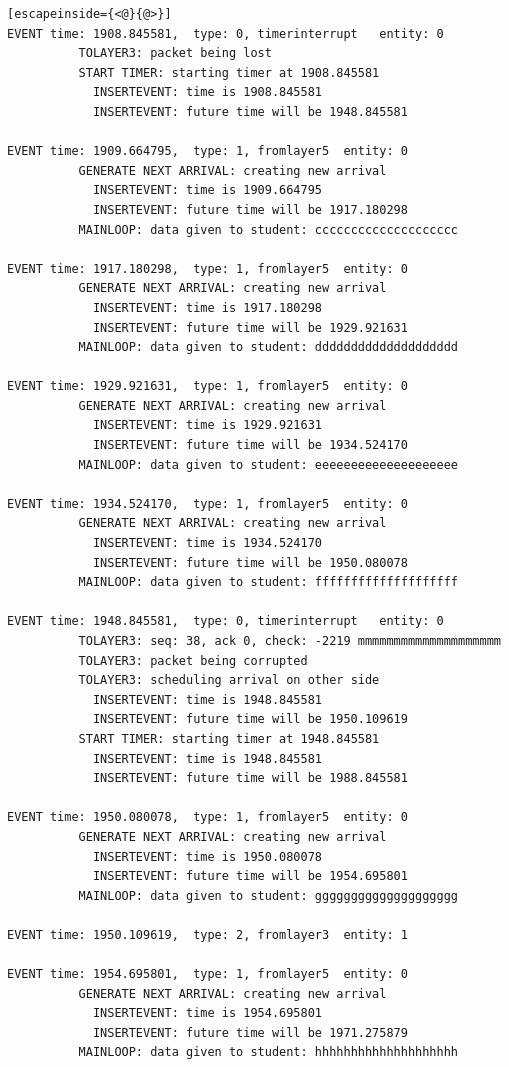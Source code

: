 \documentclass[paper=a4, fontsize=11pt]{scrartcl}
\numberwithin{equation}{section}		%
\numberwithin{figure}{section}			%
\numberwithin{table}{section}				%
\begin{document}
\begin{lstlisting}[escapeinside={<@}{@>}]
EVENT time: 1908.845581,  type: 0, timerinterrupt   entity: 0
          TOLAYER3: packet being lost
          START TIMER: starting timer at 1908.845581
            INSERTEVENT: time is 1908.845581
            INSERTEVENT: future time will be 1948.845581

EVENT time: 1909.664795,  type: 1, fromlayer5  entity: 0
          GENERATE NEXT ARRIVAL: creating new arrival
            INSERTEVENT: time is 1909.664795
            INSERTEVENT: future time will be 1917.180298
          MAINLOOP: data given to student: cccccccccccccccccccc

EVENT time: 1917.180298,  type: 1, fromlayer5  entity: 0
          GENERATE NEXT ARRIVAL: creating new arrival
            INSERTEVENT: time is 1917.180298
            INSERTEVENT: future time will be 1929.921631
          MAINLOOP: data given to student: dddddddddddddddddddd

EVENT time: 1929.921631,  type: 1, fromlayer5  entity: 0
          GENERATE NEXT ARRIVAL: creating new arrival
            INSERTEVENT: time is 1929.921631
            INSERTEVENT: future time will be 1934.524170
          MAINLOOP: data given to student: eeeeeeeeeeeeeeeeeeee

EVENT time: 1934.524170,  type: 1, fromlayer5  entity: 0
          GENERATE NEXT ARRIVAL: creating new arrival
            INSERTEVENT: time is 1934.524170
            INSERTEVENT: future time will be 1950.080078
          MAINLOOP: data given to student: ffffffffffffffffffff

EVENT time: 1948.845581,  type: 0, timerinterrupt   entity: 0
          TOLAYER3: seq: 38, ack 0, check: -2219 mmmmmmmmmmmmmmmmmmmm
          TOLAYER3: packet being corrupted
          TOLAYER3: scheduling arrival on other side
            INSERTEVENT: time is 1948.845581
            INSERTEVENT: future time will be 1950.109619
          START TIMER: starting timer at 1948.845581
            INSERTEVENT: time is 1948.845581
            INSERTEVENT: future time will be 1988.845581

EVENT time: 1950.080078,  type: 1, fromlayer5  entity: 0
          GENERATE NEXT ARRIVAL: creating new arrival
            INSERTEVENT: time is 1950.080078
            INSERTEVENT: future time will be 1954.695801
          MAINLOOP: data given to student: gggggggggggggggggggg

EVENT time: 1950.109619,  type: 2, fromlayer3  entity: 1

EVENT time: 1954.695801,  type: 1, fromlayer5  entity: 0
          GENERATE NEXT ARRIVAL: creating new arrival
            INSERTEVENT: time is 1954.695801
            INSERTEVENT: future time will be 1971.275879
          MAINLOOP: data given to student: hhhhhhhhhhhhhhhhhhhh


\end{lstlisting}
\end{document}
